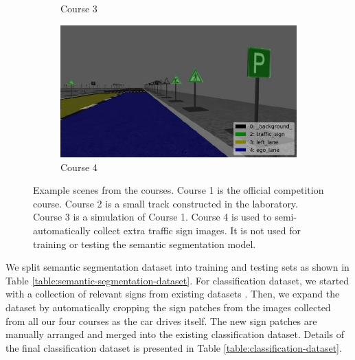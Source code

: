 \begin{figure}[h]
\begin{subfigure}[b]{0.47\linewidth}
    \caption{Course 3}
  \end{subfigure}
  \begin{subfigure}[b]{0.47\linewidth}
    \includegraphics[width=\linewidth]{figures/course4.jpg}
    \caption{Course 4}
  \end{subfigure}
  \caption[Real and simulated course scenes]{Example scenes from the courses.
    Course 1 is the official competition course. Course 2 is a small track
    constructed in the laboratory. Course 3 is a simulation of Course 1. Course
    4 is used to semi-automatically collect extra traffic sign images. It is
    not used for training or testing the semantic segmentation model.}
  \label{figure:annotated-courses}
\end{figure}

We split semantic segmentation dataset into training and testing sets as shown
in Table \ref{table:semantic-segmentation-dataset}. For classification dataset,
we started with a collection of relevant signs from existing datasets
\cite{Timofte2009MultiviewTS, Stallkamp2012ManVC, Shakhuro2016RussianTS,
Serna2018ClassificationOT, MaldonadoBascn2007RoadSignDA}. Then, we expand the
dataset by automatically cropping the sign patches from the images collected
from all our four courses as the car drives itself. The new sign patches are
manually arranged and merged into the existing classification dataset. Details
of the final classification dataset is presented in Table
\ref{table:classification-dataset}.

